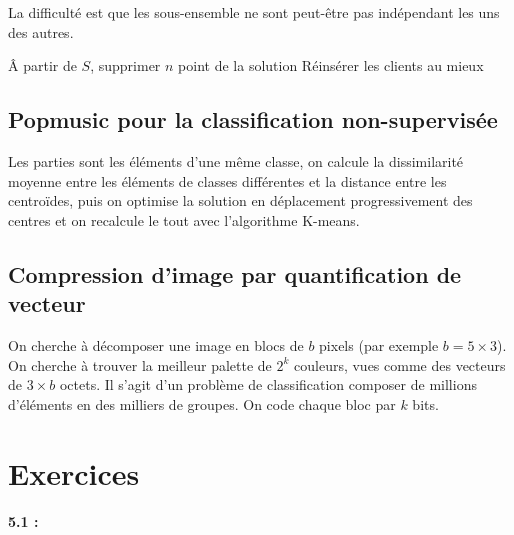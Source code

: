 \documentclass[11pt,a4paper]{report}
\begin{document}
La difficulté est que les sous-ensemble ne sont peut-être pas indépendant les uns des autres.

\begin{algorithm}[H]
\end{algorithm}

\begin{algorithm}[H]
Â partir de $S$, supprimer $n$ point de la solution\;
Réinsérer les clients au mieux\; 
\end{algorithm}

\subsection{Popmusic pour la classification non-supervisée}

Les parties sont les éléments d'une même classe, on calcule la dissimilarité moyenne entre les éléments de classes différentes et la distance entre les centroïdes, puis on optimise la solution en déplacement progressivement des centres et on recalcule le tout avec l'algorithme K-means.

\subsection{Compression d'image par quantification de vecteur}

On cherche à décomposer une image en blocs de $b$ pixels (par exemple $b=5 \times 3$). On cherche à trouver la meilleur palette de $2^k$ couleurs, vues comme des vecteurs de $3 \times b$ octets. Il s'agit d'un problème de classification composer de millions d'éléments en des milliers de groupes. On code chaque bloc par $k$ bits.

\section{Exercices}

\paragraph*{5.1 : } 
\end{document}
